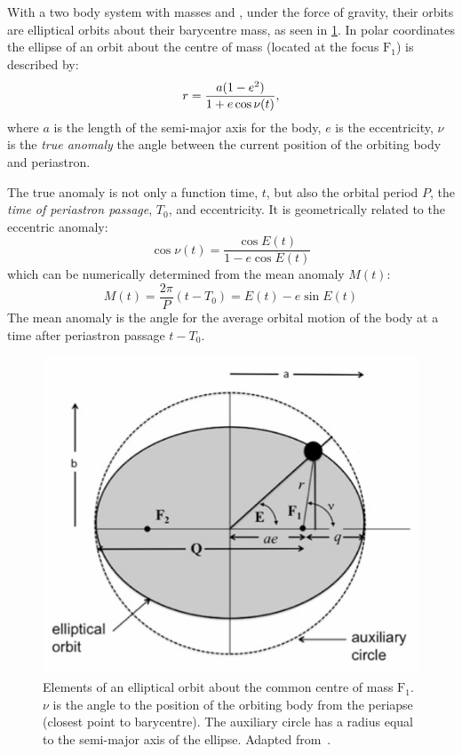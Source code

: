 With a two body system with masses \Mone{} and \Mtwo{}, under the force of gravity, their orbits are elliptical orbits about their barycentre mass, as seen in \cref{fig:eclipesorbit}.
In polar coordinates the ellipse of an orbit about the centre of mass (located at the focus $\textrm{F}_1$) is described by:
\begin{equation}
    r = \frac{a(1 - {e}^{2})}{1 + e \cos{\nu(t)}},
\end{equation}
where $a$ is the length of the semi-major axis for the body, $e$ is the eccentricity, $\nu$ is the \emph{true anomaly} the angle between the current position of the orbiting body and periastron.

The true anomaly is not only a function time, \(t\), but also the orbital period \(P\), the \emph{time of periastron passage}, \(T_0\), and eccentricity.
It is geometrically related to the eccentric anomaly:
\begin{equation}
    \cos{\nu(t)} = \frac{\cos{E(t)}}{1 - e \cos{E(t)}}
\end{equation}
which can be numerically determined from the mean anomaly \(M(t)\):
\begin{equation}
    M(t) = \frac{2 \pi}{P}(t - T_0) = E(t) - e \sin{E(t)}
\end{equation}
The mean anomaly is the angle for the average orbital motion of the body at a time after periastron passage \(t-T_0\).

\begin{figure}
    \centering
    \includegraphics[width=0.55\linewidth]{figures/fundamental_rv/eclipes_orbit2.pdf}
    \caption[Elements of an elliptical orbit.]{Elements of an elliptical orbit about the common centre of mass \(\textrm{F}_1\).
        {\(\nu\)} is the angle to the position of the orbiting body from the periapse (closest point to barycentre).
        The auxiliary circle has a radius equal to the semi-major axis of the ellipse.
        Adapted from~\citet{bozza_methods_2016}.}
    \label{fig:eclipesorbit}
\end{figure}

